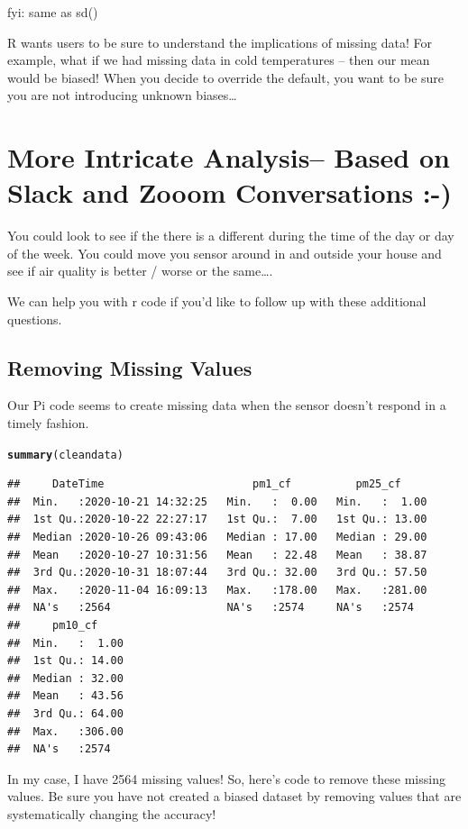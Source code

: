 \documentclass{article}\usepackage[]{graphicx}\usepackage[]{color}
\makeatletter
\newcommand{\hlstd}[1]{\textcolor[rgb]{0.345,0.345,0.345}{#1}}%
\newcommand{\hlkwd}[1]{\textcolor[rgb]{0.737,0.353,0.396}{\textbf{#1}}}%
\newenvironment{kframe}{%
 \def\at@end@of@kframe{}%
 \ifinner\ifhmode%
  \def\at@end@of@kframe{\end{minipage}}%
  \begin{minipage}{\columnwidth}%
 \fi\fi%
 \def\FrameCommand##1{\hskip\@totalleftmargin \hskip-\fboxsep
 \colorbox{shadecolor}{##1}\hskip-\fboxsep
     \hskip-\linewidth \hskip-\@totalleftmargin \hskip\columnwidth}%
 \MakeFramed {\advance\hsize-\width
   \@totalleftmargin\z@ \linewidth\hsize
   \@setminipage}}%
 {\par\unskip\endMakeFramed%
 \at@end@of@kframe}
\newenvironment{knitrout}{}{} %
\makeatother
\begin{document}
fyi: same as sd()

R wants users to be sure to understand the implications of missing data!  For example, what if we had missing data in cold temperatures -- then our mean would be biased!  When you decide to override the default, you want to be sure you are not introducing unknown biases\ldots

\section{More Intricate Analysis-- Based on Slack and Zooom Conversations :-)}

You could look to see if the there is a different during the time of the day or day of the week. You could move you sensor around in and outside your house and see if air quality is better / worse or the same\ldots.

We can help you with r code if you'd like to follow up with these additional questions. 

\subsection{Removing Missing Values}

Our Pi code seems to create missing data when the sensor doesn't respond in a timely fashion. 
\begin{knitrout}
\color{fgcolor}\begin{kframe}
\begin{alltt}
\hlkwd{summary}\hlstd{(cleandata)}
\end{alltt}
\begin{verbatim}
##     DateTime                       pm1_cf          pm25_cf      
##  Min.   :2020-10-21 14:32:25   Min.   :  0.00   Min.   :  1.00  
##  1st Qu.:2020-10-22 22:27:17   1st Qu.:  7.00   1st Qu.: 13.00  
##  Median :2020-10-26 09:43:06   Median : 17.00   Median : 29.00  
##  Mean   :2020-10-27 10:31:56   Mean   : 22.48   Mean   : 38.87  
##  3rd Qu.:2020-10-31 18:07:44   3rd Qu.: 32.00   3rd Qu.: 57.50  
##  Max.   :2020-11-04 16:09:13   Max.   :178.00   Max.   :281.00  
##  NA's   :2564                  NA's   :2574     NA's   :2574    
##     pm10_cf      
##  Min.   :  1.00  
##  1st Qu.: 14.00  
##  Median : 32.00  
##  Mean   : 43.56  
##  3rd Qu.: 64.00  
##  Max.   :306.00  
##  NA's   :2574
\end{verbatim}
\end{kframe}
\end{knitrout}
In my case, I have 2564 missing values! So, here's code to remove these missing values. Be sure you have not created a biased dataset by removing values that are systematically changing the accuracy!
\end{document}
